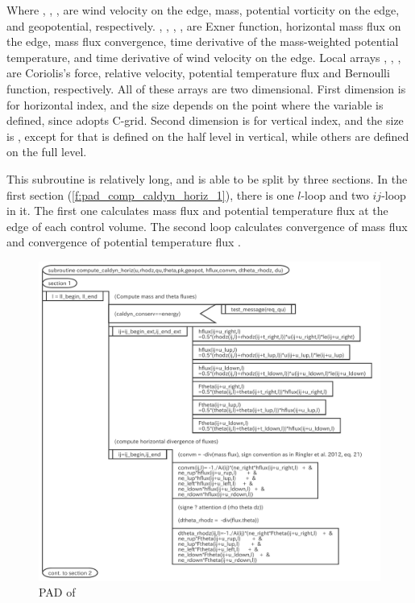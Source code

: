 Where , , ,  are wind velocity on the edge,
mass, potential vorticity on the edge, and geopotential, respectively.
, , , ,  are Exner function,
horizontal mass flux on the edge, mass flux convergence,
time derivative of the mass-weighted potential temperature,
and time derivative of wind velocity on the edge.
%
Local arrays , , ,  are
Coriolis's force, relative velocity, potential temperature flux and
Bernoulli function, respectively.
%
All of these arrays are two dimensional.
%
First dimension is for horizontal index, and the size depends on the point
where the variable is defined, since \DYNAMICO adopts C-grid.
%
Second dimension is for vertical index, and the size is ,
except  for  that is defined on the half level in
vertical, while others are defined on the full level.


This subroutine is relatively long, and is able to be split by three
sections.
%
In the first section (\autoref{f:pad_comp_caldyn_horiz_1}), there is one $l$-loop
and two $ij$-loop in it.
%
The first one calculates mass flux  and potential
temperature flux  at the edge of each control volume.
%
The second loop calculates convergence of mass flux 
and convergence of potential temperature flux .

\begin{figure}[tbp]
\centering
\includegraphics[scale=.6]{figs/caldyn_horiz_sec1.pdf}
 \caption{PAD of }\label{f:pad_comp_caldyn_horiz_1}
\end{figure}



